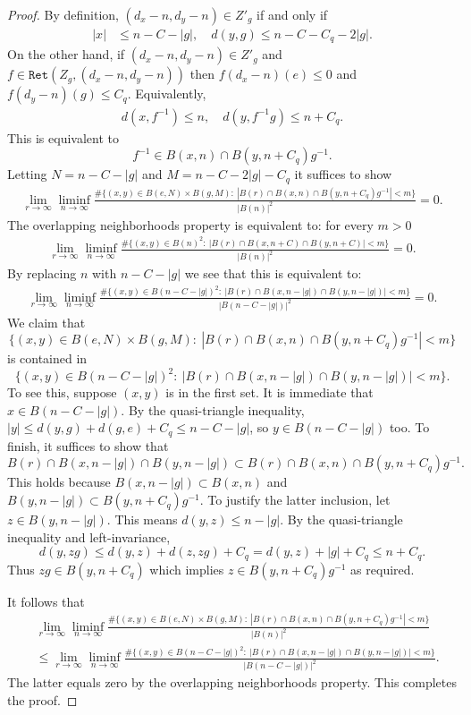 \documentclass[10pt,a4paper]{amsart}
\newcommand\Ret{\mathtt{Ret}}
\begin{document}
\begin{proof}
By definition, $(d_x-n,d_y-n) \in Z'_g$ if and only if 
\begin{align*}
    |x| &\le n - C-|g|,\quad 
    d(y,g)  \le n - C - C_q- 2|g|.
    \end{align*}
On the other hand, if $(d_x-n,d_y-n)\in Z'_g$ and $f \in \Ret(Z_g, (d_x-n,d_y-n))$ then $f(d_x-n)(e)\le 0$ and $f(d_y-n)(g)\le C_q$. Equivalently, 
\begin{align*}
d(x,f^{-1})\le n, \quad d(y,f^{-1}g)\le n+C_q.
\end{align*}
This is equivalent to
$$f^{-1} \in B(x,n) \cap B(y,n+C_q)g^{-1}.$$
Letting $N=n-C-|g|$ and $M=n-C-2|g|-C_q$ it suffices to show
\begin{align*}
\lim_{r\to\infty} \liminf_{n\to\infty}  \frac{\#\{(x,y) \in B(e,N)\times B(g,M):~|B(r) \cap B(x,n) \cap B(y,n+C_q)g^{-1}| < m\}}{|B(n)|^2} =0.
\end{align*}
The overlapping neighborhoods property is equivalent to: for every $m>0$
\begin{align*}
\lim_{r\to\infty} \liminf_{n\to\infty}  \frac{\#\{(x,y) \in B(n)^2:~|B(r) \cap B(x,n+C) \cap B(y,n+C)| < m\}}{|B(n)|^2} =0.
\end{align*}
By replacing $n$ with $n-C-|g|$ we see that this is equivalent to:
\begin{align*}
\lim_{r\to\infty} \liminf_{n\to\infty}  \frac{\#\{(x,y) \in B(n-C-|g|)^2:~|B(r) \cap B(x,n-|g|) \cap B(y,n-|g|)| < m\}}{|B(n-C-|g|)|^2} =0.
\end{align*}
We claim that
$$\{(x,y) \in B(e,N)\times B(g,M):~|B(r) \cap B(x,n) \cap B(y,n+C_q)g^{-1}| < m\}$$
is contained in
$$\{(x,y) \in B(n-C-|g|)^2:~|B(r) \cap B(x,n-|g|) \cap B(y,n-|g|)| < m\}.$$
To see this, suppose $(x,y)$ is in the first set. It is immediate that $x\in B(n-C-|g|)$. By the quasi-triangle inequality, $|y| \leq d(y,g)+d(g,e)+C_q\leq n-C-|g|$, so $y\in B(n-C-|g|)$ too. To finish, it suffices to show that
$$B(r) \cap B(x,n-|g|) \cap B(y,n-|g|) \subset B(r) \cap B(x,n) \cap B(y,n+C_q)g^{-1}.$$
This holds because $B(x,n-|g|) \subset B(x,n)$ and $B(y,n-|g|) \subset  B(y,n+C_q)g^{-1}$. To justify the latter inclusion, let $z \in B(y,n-|g|)$. This means $d(y,z)\le n-|g|$. By the quasi-triangle inequality and left-invariance,
$$d(y,zg) \le d(y,z) + d(z,zg)+C_q = d(y,z) + |g|+C_q \le n+C_q.$$
Thus $zg \in B(y,n+C_q)$ which implies $z \in B(y,n+C_q)g^{-1}$ as required.

It follows that 
\begin{align*}
&\lim_{r\to\infty} \liminf_{n\to\infty}  \frac{\#\{(x,y) \in B(e,N)\times B(g,M):~|B(r) \cap B(x,n) \cap B(y,n+C_q)g^{-1}| < m\}}{|B(n)|^2} \\
&\leq \lim_{r\to\infty} \liminf_{n\to\infty} \frac{\#\{(x,y) \in B(n-C-|g|)^2:~|B(r) \cap B(x,n-|g|) \cap B(y,n-|g|)| < m\}}{|B(n-C-|g|)|^2}.
\end{align*}
The latter equals zero by the overlapping neighborhoods property. This completes the proof.
\end{proof}
\end{document}

